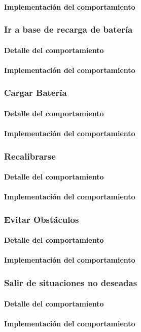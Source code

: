\paragraph{Implementaci\'on del comportamiento}

\subsubsection{Ir a base de recarga de bater\'ia}
\label{go_to_recharge}
\paragraph{Detalle del comportamiento}
\paragraph{Implementaci\'on del comportamiento}

\subsubsection{Cargar Bater\'ia}
\label{recharge_battery}
\paragraph{Detalle del comportamiento}
\paragraph{Implementaci\'on del comportamiento}

\subsubsection{Recalibrarse}
\label{recalibrate}
\paragraph{Detalle del comportamiento}
\paragraph{Implementaci\'on del comportamiento}

\subsubsection{Evitar Obst\'aculos}
\label{avoid_obstacles}
\paragraph{Detalle del comportamiento}
\paragraph{Implementaci\'on del comportamiento}

\subsubsection{Salir de situaciones no deseadas}
\label{out_of_unwanted_situations}
\paragraph{Detalle del comportamiento}
\paragraph{Implementaci\'on del comportamiento}

